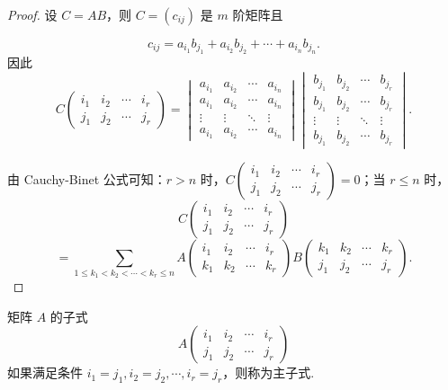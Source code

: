 \begin{proof}
    设 $C = AB$，则 $C = (c_{ij})$ 是 $m$ 阶矩阵且

    $$ c_{ij} = a_{i_1} b_{j_1} + a_{i_2} b_{j_2} + \cdots + a_{i_n} b_{j_n}. $$
    因此
    $$
    C
    \begin{pmatrix}
        i_1 & i_2 & \cdots & i_r \\
        j_1 & j_2 & \cdots & j_r
    \end{pmatrix}
    =
    \begin{vmatrix}
        a_{i_1} & a_{i_2} & \cdots & a_{i_n} \\
        a_{i_1} & a_{i_2} & \cdots & a_{i_n} \\
        \vdots & \vdots & \ddots & \vdots \\
        a_{i_1} & a_{i_2} & \cdots & a_{i_n}
    \end{vmatrix}
    \begin{vmatrix}
        b_{j_1} & b_{j_2} & \cdots & b_{j_r} \\
        b_{j_1} & b_{j_2} & \cdots & b_{j_r} \\
        \vdots & \vdots & \ddots & \vdots \\
        b_{j_1} & b_{j_2} & \cdots & b_{j_r}
    \end{vmatrix}.
    $$

    由 Cauchy-Binet 公式可知：$r > n$ 时，$C
    \begin{pmatrix}
        i_1 & i_2 & \cdots & i_r \\
        j_1 & j_2 & \cdots & j_r
    \end{pmatrix} = 0$；当 $r \leqslant n$ 时，
    $$
    C
    \begin{pmatrix}
        i_1 & i_2 & \cdots & i_r \\
        j_1 & j_2 & \cdots & j_r
    \end{pmatrix} $$
    $$ =\sum_{1 \leqslant k_1 < k_2 < \cdots < k_r \leqslant n} A
    \begin{pmatrix}
        i_1 & i_2 & \cdots & i_r \\
        k_1 & k_2 & \cdots & k_r
    \end{pmatrix}
    B
    \begin{pmatrix}
        k_1 & k_2 & \cdots & k_r \\
        j_1 & j_2 & \cdots & j_r
    \end{pmatrix}. $$
\end{proof}

矩阵 $A$ 的子式
$$ A
\begin{pmatrix}
    i_1 & i_2 & \cdots & i_r \\
    j_1 & j_2 & \cdots & j_r
\end{pmatrix} $$
如果满足条件 $i_1 = j_1, i_2 = j_2, \cdots, i_r = j_r$，则称为主子式.

